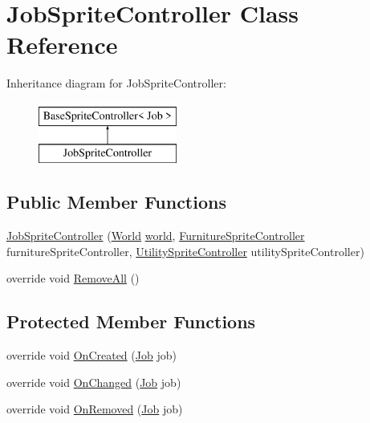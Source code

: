 \hypertarget{class_job_sprite_controller}{}\section{Job\+Sprite\+Controller Class Reference}
\label{class_job_sprite_controller}
Inheritance diagram for Job\+Sprite\+Controller\+:\begin{figure}[H]
\begin{center}
\leavevmode
\includegraphics[height=2.000000cm]{class_job_sprite_controller}
\end{center}
\end{figure}
\subsection*{Public Member Functions}
\begin{DoxyCompactItemize}
\item 
\hyperlink{class_job_sprite_controller_a10fc503c1e338bd2aaa518166397dcd8}{Job\+Sprite\+Controller} (\hyperlink{class_world}{World} \hyperlink{class_base_sprite_controller_a593ea6a31165eff51a0acffc12ea65ca}{world}, \hyperlink{class_furniture_sprite_controller}{Furniture\+Sprite\+Controller} furniture\+Sprite\+Controller, \hyperlink{class_utility_sprite_controller}{Utility\+Sprite\+Controller} utility\+Sprite\+Controller)
\item 
override void \hyperlink{class_job_sprite_controller_ae84f16c980f6376985c0752874dc28a4}{Remove\+All} ()
\end{DoxyCompactItemize}
\subsection*{Protected Member Functions}
\begin{DoxyCompactItemize}
\item 
override void \hyperlink{class_job_sprite_controller_a5b23ec5cf4c9cbb179d356271638cdbf}{On\+Created} (\hyperlink{class_job}{Job} job)
\item 
override void \hyperlink{class_job_sprite_controller_a874ad305f04327c47898e55f0f7940da}{On\+Changed} (\hyperlink{class_job}{Job} job)
\item 
override void \hyperlink{class_job_sprite_controller_afb4a365c93a9b909cb4634a4e800d818}{On\+Removed} (\hyperlink{class_job}{Job} job)
\end{DoxyCompactItemize}
